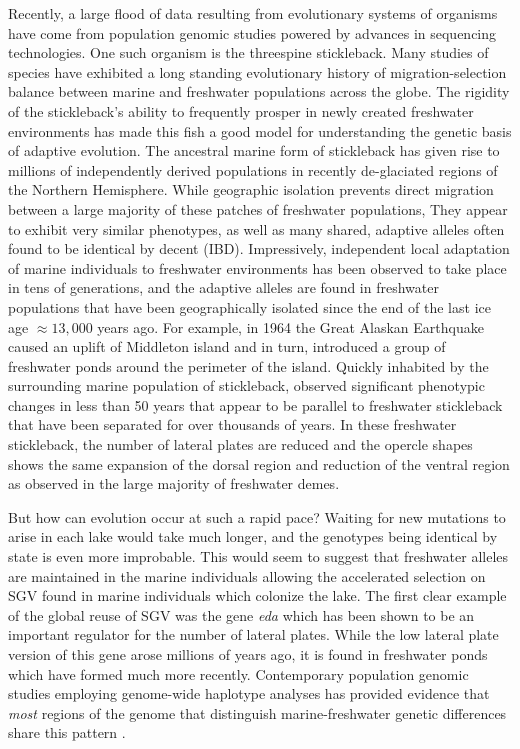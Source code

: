 \documentclass{article}
\begin{document}
Recently, a large flood of data resulting from evolutionary systems of organisms have come from population genomic studies powered by advances in sequencing technologies. One such organism is the threespine stickleback. Many studies of species have exhibited a long standing evolutionary history of migration-selection balance between marine and freshwater populations across the globe. The rigidity of the stickleback's ability to frequently prosper in newly created freshwater environments has made this fish a good model for understanding the genetic basis of adaptive evolution. The ancestral marine form of stickleback has given rise to millions of independently derived populations in recently de-glaciated regions of the Northern Hemisphere. While geographic isolation prevents direct migration between a large majority of these patches of freshwater populations, They appear to exhibit very similar phenotypes, as well as many shared, adaptive alleles often found to be identical by decent (IBD). Impressively, independent local adaptation of marine individuals to freshwater environments has been observed to take place in tens of generations, and the adaptive alleles are found in freshwater populations that have been geographically isolated since the end of the last ice age $\approx 13,000$ years ago. For example, in 1964 the Great Alaskan Earthquake caused an uplift of Middleton island and in turn, introduced a group of freshwater ponds around the perimeter of the island. Quickly inhabited by the surrounding marine population of stickleback, \citet{lescak2015evolution} observed significant phenotypic changes in less than 50 years that appear to be parallel to freshwater stickleback that have been separated for over thousands of years. In these freshwater stickleback, the number of lateral plates are reduced and the opercle shapes shows the same expansion of the dorsal region and reduction of the ventral region as observed in the large majority of freshwater demes.

But how can evolution occur at such a rapid pace? Waiting for new mutations to arise in each lake would take much longer, and the genotypes being identical by state is even more improbable. This would seem to suggest that freshwater alleles are maintained in the marine individuals allowing the accelerated selection on SGV found in marine individuals which colonize the lake. The first clear example of the global reuse of SGV was the gene \textit{eda} which has been shown to be an important regulator for the number of lateral plates. While the low lateral plate version of this gene arose millions of years ago, it is found in freshwater ponds which have formed much more recently. Contemporary population genomic studies employing genome-wide haplotype analyses has provided evidence that \textit{most} regions of the genome that distinguish marine-freshwater genetic differences share this pattern \citep{nelson2017ancient}. 
 
\end{document}
